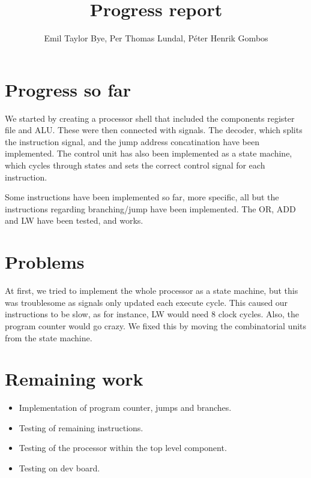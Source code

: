 \documentclass[11pt]{article} %
\title{Progress report}
\author{Emil Taylor Bye, Per Thomas Lundal, Péter Henrik Gombos}
\begin{document}
\maketitle

\section{Progress so far}
We started by creating a processor shell that included the components register file and ALU. These were then connected with signals. The decoder, which splits the instruction signal, and the jump address concatination have been implemented. The control unit has also been implemented as a state machine, which cycles through states and sets the correct control signal for each instruction. 

Some instructions have been implemented so far, more specific, all but the instructions regarding branching/jump have been implemented. The OR, ADD and LW have been tested, and works.

\section{Problems}
At first, we tried to implement the whole processor as a state machine, but this was troublesome as signals only updated each execute cycle. This caused our instructions to be slow, as for instance, LW would need 8 clock cycles. Also, the program counter would go crazy. We fixed this by moving the combinatorial units from the state machine.

\section{Remaining work}

\begin{itemize}
\item Implementation of program counter, jumps and branches.

\item Testing of remaining instructions.

\item Testing of the processor within the top level component.

\item Testing on dev board.
\end{itemize}
\end{document}

